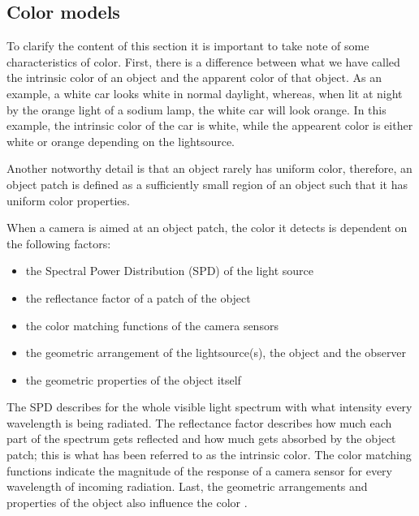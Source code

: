 \documentclass[a4paper,11pt]{article}
\begin{document}
\subsection{Color models}

To clarify the content of this section it is important to take note of some characteristics of color. First, there is a difference between what we have called the intrinsic color of an object and the apparent color of that object. As an example, a white car looks white in normal daylight, whereas, when lit at night by the orange light of a sodium lamp, the white car will look orange. In this example, the intrinsic color of the car is white, while the appearent color is either white or orange depending on the lightsource.



Another notworthy detail is that an object rarely has uniform color, therefore, an object patch is defined as a sufficiently small region of an object such that it has uniform color properties. 



When a camera is aimed at an object patch, the color it detects is dependent on the following factors: 

\begin{itemize}

\item the Spectral Power Distribution (SPD) of the light source

\item the reflectance factor of a patch of the object

\item the color matching functions of the camera sensors 

\item the geometric arrangement of the lightsource(s), the object and the observer

\item the geometric properties of the object itself

\end{itemize}

The SPD describes for the whole visible light spectrum with what intensity every wavelength is being radiated. The reflectance factor describes how much each part of the spectrum gets reflected and how much gets absorbed by the object patch; this is what has been referred to as the intrinsic color. The color matching functions indicate the magnitude of the response of a camera sensor for every wavelength of incoming radiation. Last, the geometric arrangements and properties of the object also influence the color \cite{gevers_color}.
\end{document}
